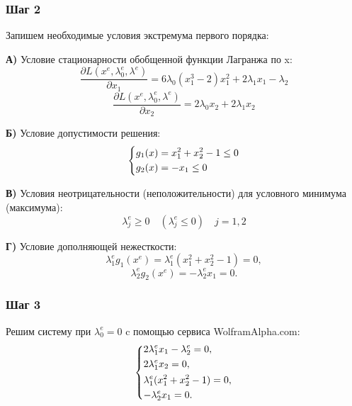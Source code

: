 \documentclass[a4paper, 12pt]{article}   	%
\begin{document}
\subsubsection{Шаг 2}
    Запишем необходимые условия экстремума первого порядка:
    
    \textbf{А)} Условие стационарности обобщенной функции Лагранжа по x:
    \begin{equation}
        \frac{\partial L(x^e, \lambda_0^e, \lambda^e)}{\partial x_1} = 6 \lambda_0 (x_1^3 - 2)x_1^2 + 2 \lambda_1 x_1 - \lambda_2
    \end{equation}
    \begin{equation}
        \frac{\partial L(x^e, \lambda_0^e, \lambda^e)}{\partial x_2} = 2 \lambda_0 x_2 + 2 \lambda_1 x_2
    \end{equation}
    
    \textbf{Б)} Условие допустимости решения:
    \begin{equation}
        \begin{dcases*}
            g_1(x) = x^2_1 + x^2_2 - 1 \leq 0 \\
            g_2(x) = -x_1 \leq 0
        \end{dcases*}
    \end{equation}
    
    \textbf{В)} Условия неотрицательности (неположительности) для условного минимума (максимума):
    \begin{equation}
        \lambda_j^e \geq 0 \quad (\lambda_j^e \leq 0) \quad j = 1, 2
    \end{equation}
     
    \textbf{Г)} Условие дополняющей нежесткости:
    \begin{equation}
        \lambda_1^e g_1(x^e) = \lambda_1^e(x^2_1 + x^2_2 - 1) = 0,
    \end{equation}
    \begin{equation}
        \lambda_2^e g_2(x^e) = -\lambda_2^e x_1 = 0.
    \end{equation}
    
\subsubsection{Шаг 3}
    Решим систему при $\lambda_0^e = 0$ c помощью сервиса WolframAlpha.com:
    \begin{equation}
        \begin{dcases*}
            2 \lambda_1^e x_1 - \lambda_2^e = 0, \\
            2 \lambda_1^e x_2 = 0, \\
            \lambda_1^e(x^2_1 + x^2_2 - 1) = 0, \\
           -\lambda_2^e x_1 = 0.
        \end{dcases*}
    \end{equation}
    
\end{document}
